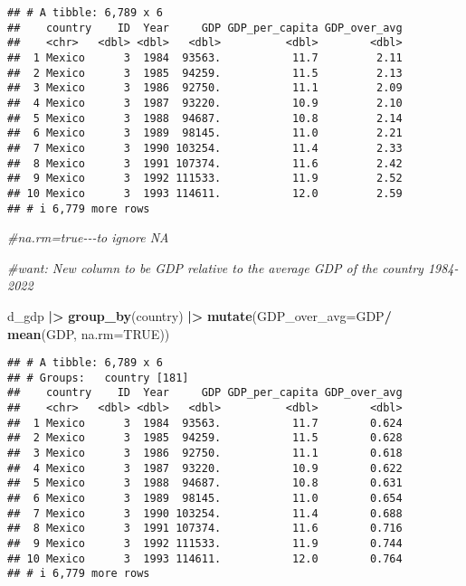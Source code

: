 \documentclass[
]{article}
\newenvironment{Shaded}{\begin{snugshade}}{\end{snugshade}}
\newcommand{\AttributeTok}[1]{\textcolor[rgb]{0.13,0.29,0.53}{#1}}
\newcommand{\CommentTok}[1]{\textcolor[rgb]{0.56,0.35,0.01}{\textit{#1}}}
\newcommand{\ConstantTok}[1]{\textcolor[rgb]{0.56,0.35,0.01}{#1}}
\newcommand{\FunctionTok}[1]{\textcolor[rgb]{0.13,0.29,0.53}{\textbf{#1}}}
\newcommand{\NormalTok}[1]{#1}
\newcommand{\SpecialCharTok}[1]{\textcolor[rgb]{0.81,0.36,0.00}{\textbf{#1}}}
\begin{document}
\begin{verbatim}
## # A tibble: 6,789 x 6
##    country    ID  Year     GDP GDP_per_capita GDP_over_avg
##    <chr>   <dbl> <dbl>   <dbl>          <dbl>        <dbl>
##  1 Mexico      3  1984  93563.           11.7         2.11
##  2 Mexico      3  1985  94259.           11.5         2.13
##  3 Mexico      3  1986  92750.           11.1         2.09
##  4 Mexico      3  1987  93220.           10.9         2.10
##  5 Mexico      3  1988  94687.           10.8         2.14
##  6 Mexico      3  1989  98145.           11.0         2.21
##  7 Mexico      3  1990 103254.           11.4         2.33
##  8 Mexico      3  1991 107374.           11.6         2.42
##  9 Mexico      3  1992 111533.           11.9         2.52
## 10 Mexico      3  1993 114611.           12.0         2.59
## # i 6,779 more rows
\end{verbatim}

\begin{Shaded}
\begin{Highlighting}[]
\CommentTok{\#na.rm=true{-}{-}{-}to ignore NA}
\end{Highlighting}
\end{Shaded}

\begin{Shaded}
\begin{Highlighting}[]
\CommentTok{\#want: New column to be GDP relative to the average GDP of the country 1984{-}2022}

\NormalTok{d\_gdp }\SpecialCharTok{|\textgreater{}} 
  \FunctionTok{group\_by}\NormalTok{(country) }\SpecialCharTok{|\textgreater{}}
\FunctionTok{mutate}\NormalTok{(}\AttributeTok{GDP\_over\_avg=}\NormalTok{GDP}\SpecialCharTok{/} \FunctionTok{mean}\NormalTok{(GDP, }\AttributeTok{na.rm=}\ConstantTok{TRUE}\NormalTok{))}
\end{Highlighting}
\end{Shaded}

\begin{verbatim}
## # A tibble: 6,789 x 6
## # Groups:   country [181]
##    country    ID  Year     GDP GDP_per_capita GDP_over_avg
##    <chr>   <dbl> <dbl>   <dbl>          <dbl>        <dbl>
##  1 Mexico      3  1984  93563.           11.7        0.624
##  2 Mexico      3  1985  94259.           11.5        0.628
##  3 Mexico      3  1986  92750.           11.1        0.618
##  4 Mexico      3  1987  93220.           10.9        0.622
##  5 Mexico      3  1988  94687.           10.8        0.631
##  6 Mexico      3  1989  98145.           11.0        0.654
##  7 Mexico      3  1990 103254.           11.4        0.688
##  8 Mexico      3  1991 107374.           11.6        0.716
##  9 Mexico      3  1992 111533.           11.9        0.744
## 10 Mexico      3  1993 114611.           12.0        0.764
## # i 6,779 more rows
\end{verbatim}
\end{document}

